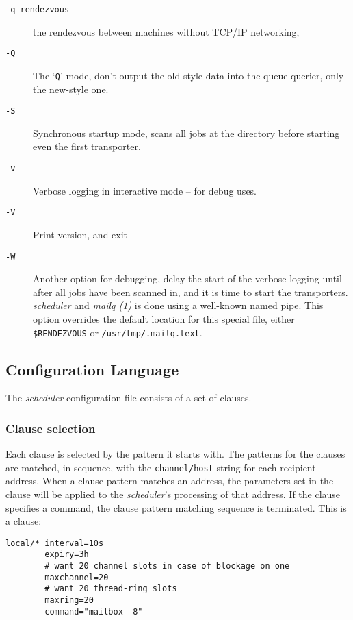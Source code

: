 \begin{description}
\item[{\tt -q rendezvous}] \mbox{}

the rendezvous between machines without TCP/IP networking, 

\item[{\tt -Q}] \mbox{}

The `{\tt Q}'-mode, don't output the old style data into the queue 
querier, only the new-style one.

\item[{\tt -S}] \mbox{}

Synchronous startup mode, scans all jobs at the directory before 
starting even the first transporter.

\item[{\tt -v}] \mbox{}

Verbose logging in interactive mode -- for debug uses.

\item[{\tt -V}] \mbox{}

Print version, and exit

\item[{\tt -W}] \mbox{}

Another option for debugging, delay the start of the verbose logging
until after all jobs have been scanned in, and it is time to start the transporters. 
{\em scheduler\/} and {\em mailq (1)\/} is done using a well-known named pipe. 
This option overrides the default location for this special file, either 
{\tt \$RENDEZVOUS} or {\tt /usr/tmp/.mailq.text}.

\end{description}




\subsection{Configuration Language}
\label{schedulerconfig}

The {\em scheduler\/} configuration file consists of a set of clauses. 




\subsubsection{Clause selection}

Each clause is selected by
the pattern it starts with. The patterns for the clauses are matched,
in sequence, with the {\tt channel/host} string for each recipient
address. When a clause pattern matches an address, the parameters set in
the clause will be applied to the {\em scheduler\/}'s processing of 
that address. If the clause specifies a command, the clause pattern 
matching sequence is terminated. This is a clause:
\begin{verbatim}
local/* interval=10s
        expiry=3h
        # want 20 channel slots in case of blockage on one
        maxchannel=20
        # want 20 thread-ring slots
        maxring=20
        command="mailbox -8"
\end{verbatim}


